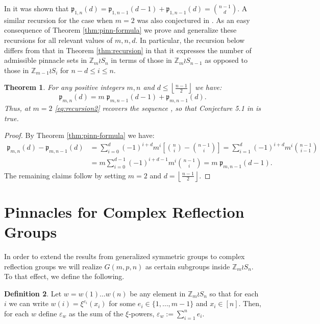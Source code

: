 \documentclass[12pt,reqno]{amsart}
\numberwithin{equation}{section}
\theoremstyle{plain}
\newtheorem{theorem}{Theorem}[section]
\theoremstyle{definition}
\newtheorem{definition}[theorem]{Definition}
\theoremstyle{remark}
\newcommand{\Z}{\mathbb{Z}}
\newcommand{\p}{\mathfrak{p}}
\newcommand{\floor}[1]{\left\lfloor#1\right\rfloor}
\begin{document}
In \cite[Prop. 3.11]{PinSignedPermutations} it was shown that
$\p_{1, n}(d)=\p_{1,n-1}(d-1) + \p_{1,n-1}(d)=\binom{n-1}{d}$. 
A similar recursion for the case when $m=2$ was also conjectured in \cite[Conjecture 5.1]{PinSignedPermutations}. 
As an easy consequence of Theorem \ref{thm:pinn-formula} we prove and generalize these recursions for all relevant values of $m,n,d$. In particular, the recursion below differs from that in Theorem \ref{thm:recursion} in that it expresses the number of admissible pinnacle sets in $\Z_m \wr S_n$ in terms of those in $\Z_m\wr S_{n-1}$ as opposed to those in $\Z_{m-1} \wr S_i$ for $n-d\leq i \leq n$.

\begin{theorem}\label{thm:recursion2}
    For any positive integers $m,n$ and $d\leq \floor{\frac{n-1}{2}}$ we have:
    \begin{equation}\label{eq:recursion2}
\p_{m,n}(d) = m\;\p_{m,n-1}(d-1)+\p_{m,n-1}(d). \end{equation}
Thus, at $m=2$ \eqref{eq:recursion2} recovers the sequence \cite[A119258]{OEIS}, so that Conjecture 5.1 in \cite{PinSignedPermutations} is true.
\end{theorem}

\begin{proof}
    By Theorem \ref{thm:pinn-formula} we have: 
    \begin{align*}
       \p_{m, n}(d) - \p_{m, n-1}(d) 
        &=  \sum_{i=0}^d (-1)^{i+d}m^i\left\lbrack \binom{n}{i} - \binom{n-1}{i} \right\rbrack  
        = \sum_{i=1}^d (-1)^{i+d}m^i\binom{n-1}{i-1}  \\
       & =m\sum^{d-1}_{i=0}(-1)^{i+d-1}m^i\binom{n-1}{i} =m\;\p_{m, n-1}(d-1).
    \end{align*}
    The remaining claims follow by setting $m=2$ and $d=\floor{\frac{n-1}{2}}$.
\end{proof}


\section{Pinnacles for Complex Reflection Groups}\label{sec:ComplexReflGroup}
In order to extend the results from generalized symmetric groups to complex reflection groups we will realize $G(m,p,n)$ as certain subgroups inside $\Z_m \wr S_n$. To that effect, we define the following. 

\begin{definition}
    Let $w=w(1)\dots w(n)$ be any element in $\Z_m \wr S_n$ so that for each $i$ we can write $w(i)=\xi^{e_i}(x_i)$ for some $e_i \in \{1,\dots,m-1\}$ and $x_i \in [n]$. Then, for each $w$ define $\varepsilon_w$ as the sum of the $\xi$-powers, $\varepsilon_w:= \sum_{i=1}^ne_i$. 
\end{definition}
\end{document}
